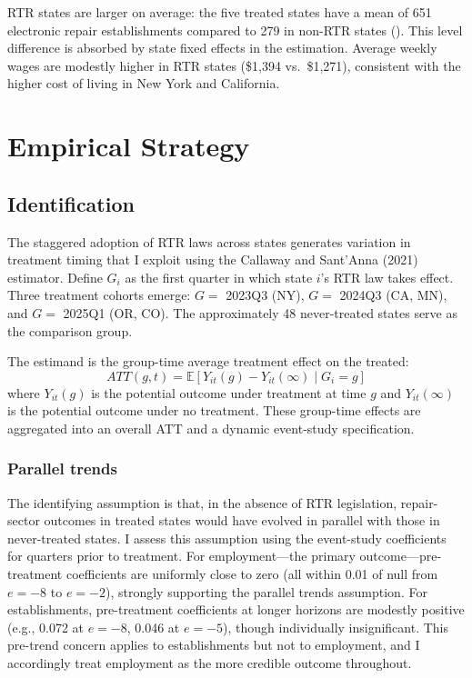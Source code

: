 \documentclass[12pt]{article}
\newcommand{\E}{\mathbb{E}}
\begin{document}
RTR states are larger on average: the five treated states have a mean of 651 electronic repair establishments compared to 279 in non-RTR states (). This level difference is absorbed by state fixed effects in the estimation. Average weekly wages are modestly higher in RTR states (\$1,394 vs.\ \$1,271), consistent with the higher cost of living in New York and California.

\section{Empirical Strategy}

\subsection{Identification}

The staggered adoption of RTR laws across states generates variation in treatment timing that I exploit using the Callaway and Sant'Anna (2021) estimator. Define $G_i$ as the first quarter in which state $i$'s RTR law takes effect. Three treatment cohorts emerge: $G = $ 2023Q3 (NY), $G = $ 2024Q3 (CA, MN), and $G = $ 2025Q1 (OR, CO). The approximately 48 never-treated states serve as the comparison group.

The estimand is the group-time average treatment effect on the treated:
\begin{equation}
ATT(g,t) = \E[Y_{it}(g) - Y_{it}(\infty) \mid G_i = g]
\end{equation}
where $Y_{it}(g)$ is the potential outcome under treatment at time $g$ and $Y_{it}(\infty)$ is the potential outcome under no treatment. These group-time effects are aggregated into an overall ATT and a dynamic event-study specification.

\subsubsection*{Parallel trends} The identifying assumption is that, in the absence of RTR legislation, repair-sector outcomes in treated states would have evolved in parallel with those in never-treated states. I assess this assumption using the event-study coefficients for quarters prior to treatment. For employment---the primary outcome---pre-treatment coefficients are uniformly close to zero (all within 0.01 of null from $e=-8$ to $e=-2$), strongly supporting the parallel trends assumption. For establishments, pre-treatment coefficients at longer horizons are modestly positive (e.g., 0.072 at $e=-8$, 0.046 at $e=-5$), though individually insignificant. This pre-trend concern applies to establishments but not to employment, and I accordingly treat employment as the more credible outcome throughout.
\end{document}
